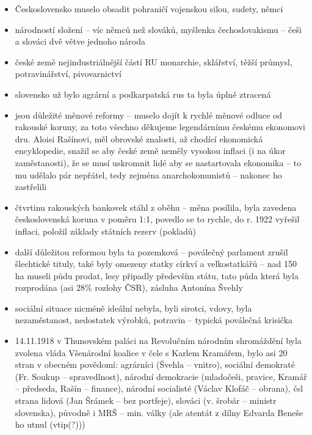 \documentclass{article}
\title{\vspace{-2cm}\vspace{-1.7cm}}
\date{}
\author{}
\begin{document}
\maketitle

\begin{itemize}
  \item Československo muselo obsadit pohraničí vojenskou silou, sudety, němci
  \item národností složení -- víc němců než slováků, myšlenka čechoslovakismu -- češi a slováci dvě větve jednoho národa
  \item české země nejindustriálnější částí RU monarchie, sklářství, těžší průmysl, potravinářství, pivovarnictví
  \item slovensko už bylo agrární a podkarpatská rus ta byla úplně ztracená
  \item jsou důležité měnové reformy -- muselo dojít k rychlé měnové odluce od rakouské koruny, za toto všechno děkujeme legendárnímu českému ekonomovi dru. Aloisi Rašínovi, měl obrovské znalosti, až chodící ekonomická encyklopedie, snažil se aby české země neměly vysokou inflaci (i na úkor zaměstanosti), že se musí uskromnit lidé aby se nastartovala ekonomika -- to mu udělalo pár nepřátel, tedy zejména anarchokomunistů -- nakonec ho zastřelili
  \item čtvrtinu rakouských bankovek stáhl z oběhu -- měna posílila, byla zavedena československá koruna v poměru 1:1, povedlo se to rychle, do r. 1922 vyřešil inflaci, položil základy státních rezerv (pokladů)
  \item další důležitou reformou byla ta pozemková -- poválečný parlament zrušil šlechtické tituly, také byly omezeny statky církví a velkostatkářů -- nad 150 ha museli půdu prodat, lesy připadly především státu, tato půda která byla rozprodána (asi 28\% rozlohy ČSR), zásluha Antonína Švehly
  \item sociální situace nicméně ideální nebyla, byli sirotci, vdovy, byla nezaměstanost, nedostatek výrobků, potravin -- typická poválečná krisička
  \item 14.11.1918 v Thunovském paláci na Revolučním národním shromáždění byla zvolena vláda Všenárodní koalice v čele s Karlem Kramářem, bylo asi 20 stran v obecném povědomí: agrárníci (Švehla -- vnitro), sociální demokraté (Fr. Soukup -- spravedlnost), národní demokracie (mladočeši, pravice, Kramář -- předseda, Rašín -- finance), národní socialisté (Václav Klofáč -- obrana), čsl strana lidová (Jan Šrámek -- bez portfeje), slováci (v. šrobár -- ministr slovenska), původně i MRŠ -- min. války (ale atentát z dílny Edvarda Beneše ho utnul (vtip(?)))

\end{itemize}
\end{document}
